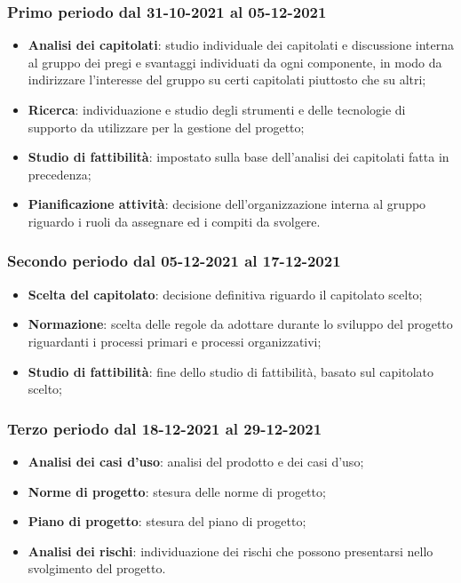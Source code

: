 	\subsubsection{Primo periodo dal 31-10-2021 al 05-12-2021}
	\begin{itemize}
	\item \textbf{Analisi dei capitolati}: studio individuale dei capitolati e discussione interna al gruppo dei pregi e svantaggi individuati da ogni componente, in modo da indirizzare l’interesse del gruppo su certi capitolati piuttosto che su altri;
	\item \textbf{Ricerca}: individuazione e studio degli strumenti e delle tecnologie di supporto da utilizzare per
	la gestione del progetto;
	\item \textbf{Studio di fattibilità}: impostato sulla base dell’analisi dei capitolati fatta in precedenza;
	\item \textbf {Pianificazione attività}: decisione dell’organizzazione interna al gruppo riguardo i ruoli
	da assegnare ed i compiti da svolgere.
	\end{itemize}
	
	\subsubsection{Secondo periodo dal 05-12-2021 al 17-12-2021}
	\begin{itemize}
	\item \textbf{Scelta del capitolato}: decisione definitiva riguardo il capitolato scelto;
	\item \textbf{Normazione}: scelta delle regole da adottare durante lo sviluppo del progetto riguardanti i
	processi primari e processi organizzativi;
	\item \textbf{Studio di fattibilità}: fine dello studio di fattibilità, basato sul capitolato scelto;
	\end{itemize}
	
	\subsubsection{Terzo periodo dal 18-12-2021 al 29-12-2021}
	\begin{itemize}
		\item \textbf{Analisi dei casi d'uso}: analisi del prodotto e dei casi d’uso;
		\item \textbf{Norme di progetto}: stesura delle norme di progetto;
		\item \textbf{Piano di progetto}: stesura del piano di progetto;
		\item \textbf{Analisi dei rischi}: individuazione dei rischi che possono presentarsi nello svolgimento del
		progetto.
	\end{itemize}
	
